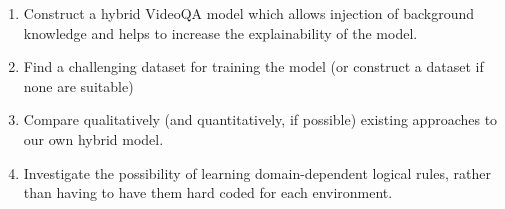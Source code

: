 \documentclass[../interim.tex]{subfiles}
\begin{document}
\begin{enumerate}
  \item Construct a hybrid VideoQA model which allows injection of background knowledge and helps to increase the explainability of the model.

  \item Find a challenging dataset for training the model (or construct a dataset if none are suitable)

  \item Compare qualitatively (and quantitatively, if possible) existing approaches to our own hybrid model.

  \item Investigate the possibility of learning domain-dependent logical rules, rather than having to have them hard coded for each environment.
\end{enumerate}
\end{document}
